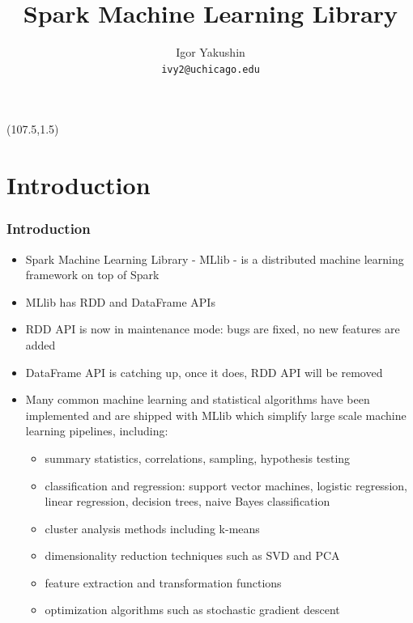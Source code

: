 \documentclass{beamer}
\title{\huge{Spark Machine Learning Library}}
\author{Igor Yakushin \\ \texttt{ivy2@uchicago.edu}}
\newcommand{\SPARK}{
\begin{textblock}{14}(107.5,1.5)
  \pgfuseimage{spark}
\end{textblock}
}
\begin{document}



\begin{frame}
\SPARK
\titlepage
\end{frame}

\section{Introduction}
\begin{frame}[fragile]
\frametitle{Introduction}
\begin{itemize}
\item Spark Machine Learning Library - {\color{mycolordef}MLlib} - is a distributed machine learning framework on top of Spark
\item MLlib has RDD and DataFrame APIs
\item RDD API is now in maintenance mode: bugs are fixed, no new features are added
\item DataFrame API is catching up, once it does, RDD API will be removed
\item Many common machine learning and statistical algorithms have been implemented and are shipped with MLlib which simplify large scale machine learning pipelines, including:
  \begin{itemize}
    \item summary statistics, correlations, sampling, hypothesis testing
    \item classification and regression: support vector machines, logistic regression, linear regression, decision trees, naive Bayes classification
    \item cluster analysis methods including k-means
    \item dimensionality reduction techniques such as SVD and PCA
    \item feature extraction and transformation functions
    \item optimization algorithms such as stochastic gradient descent
  \end{itemize}
\end{itemize}
\end{frame}
\end{document}
